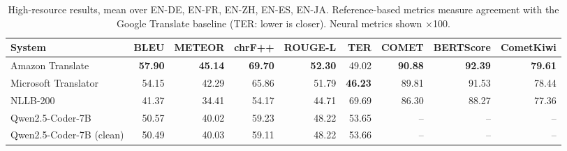 \begin{table}[t]
\centering
\caption{High-resource results, mean over EN-DE, EN-FR, EN-ZH, EN-ES, EN-JA. Reference-based metrics measure agreement with the Google Translate baseline (TER: lower is closer). Neural metrics shown $\times$100.\label{tab:high_resource}}
\begin{tabular}{lrrrrrrrr}
\toprule
System & BLEU & METEOR & chrF++ & ROUGE-L & TER & COMET & BERTScore & CometKiwi \\
\midrule
Amazon Translate & \textbf{57.90} & \textbf{45.14} & \textbf{69.70} & \textbf{52.30} & 49.02 & \textbf{90.88} & \textbf{92.39} & \textbf{79.61} \\
Microsoft Translator & 54.15 & 42.29 & 65.86 & 51.79 & \textbf{46.23} & 89.81 & 91.53 & 78.44 \\
NLLB-200 & 41.37 & 34.41 & 54.17 & 44.71 & 69.69 & 86.30 & 88.27 & 77.36 \\
Qwen2.5-Coder-7B & 50.57 & 40.02 & 59.23 & 48.22 & 53.65 & -- & -- & -- \\
Qwen2.5-Coder-7B (clean) & 50.49 & 40.03 & 59.11 & 48.22 & 53.66 & -- & -- & -- \\
\bottomrule
\end{tabular}
\end{table}
